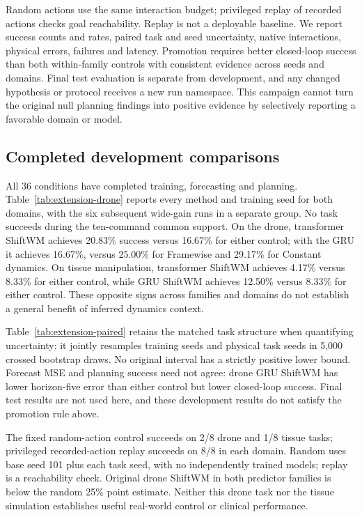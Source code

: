 Random actions use the same interaction budget; privileged replay of
recorded actions checks goal reachability. Replay is not a deployable
baseline. We report success counts and rates, paired task and seed
uncertainty, native interactions, physical errors, failures and latency.
Promotion requires better closed-loop success than both
within-family controls with consistent evidence across seeds and domains.
Final test evaluation is separate from development, and any changed
hypothesis or protocol receives a new run namespace. This campaign cannot
turn the original null planning findings into positive evidence by
selectively reporting a favorable domain or model.

\subsection{Completed development comparisons}
\label{sec:drone-development}
All 36 conditions have completed training, forecasting and planning.
Table~\ref{tab:extension-drone} reports every method and training seed for
both domains, with the six subsequent wide-gain runs in a separate group.
No task succeeds during the ten-command common support.
On the drone, transformer ShiftWM achieves 20.83\% success versus
16.67\% for either control; with the GRU it achieves 16.67\%, versus
25.00\% for Framewise and 29.17\% for Constant dynamics.
On tissue manipulation, transformer ShiftWM achieves 4.17\% versus
8.33\% for either control, while GRU ShiftWM achieves 12.50\% versus
8.33\% for either control. These opposite signs across families and
domains do not establish a general benefit of inferred dynamics context.

Table~\ref{tab:extension-paired} retains the matched task structure when
quantifying uncertainty: it jointly resamples training seeds and physical
task seeds in 5,000 crossed bootstrap draws. No original interval has a
strictly positive lower bound. Forecast MSE and planning success need not
agree: drone GRU ShiftWM has lower horizon-five error than either control
but lower closed-loop success. Final test results are not used here, and
these development results do not satisfy the promotion rule above.

The fixed random-action control succeeds on 2/8 drone and 1/8 tissue tasks;
privileged recorded-action replay succeeds on 8/8 in each domain.
Random uses base seed 101 plus each task seed, with no independently
trained models; replay is a reachability check. Original drone ShiftWM
in both predictor families is below the random 25\% point estimate.
Neither this drone task nor the tissue simulation establishes useful
real-world control or clinical performance.

